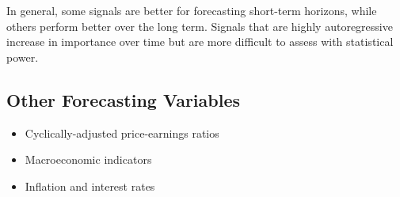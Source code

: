 \documentclass{article}
\begin{document}
In general, some signals are better for forecasting short-term horizons, while others perform better over the long term. Signals that are highly autoregressive increase in importance over time but are more difficult to assess with statistical power.

\subsection{Other Forecasting Variables}
\begin{itemize}
    \item Cyclically-adjusted price-earnings ratios
    \item Macroeconomic indicators
    \item Inflation and interest rates
\end{itemize}
\end{document}

